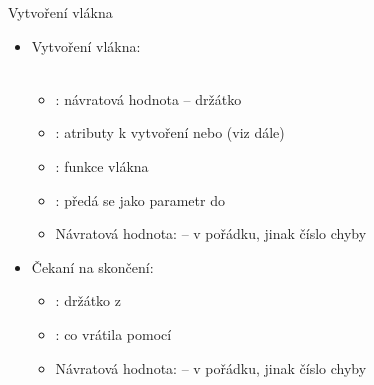 \begin{frame}{Vytvoření vlákna}

  \begin{itemize}

     \fi

    \item Vytvoření vlákna: \\ {\footnotesize
    \\
    }
    \begin{itemize}
      \item {}: návratová hodnota -- držátko
      \item {}: atributy k vytvoření nebo 
        \ifpcdirlinuxb (viz dále) \fi
      \item {}: funkce vlákna
      \item {}: předá se jako parametr do 
      \item Návratová hodnota:  -- v pořádku, jinak číslo chyby
    \end{itemize}

    \pause

    \item Čekaní na skončení: \\ {\footnotesize
    }
    \begin{itemize}
      \item {}: držátko z 
      \item {}: co vrátila  pomocí 
      \item Návratová hodnota:  -- v pořádku, jinak číslo chyby
    \end{itemize}
  \end{itemize}

\end{frame}

